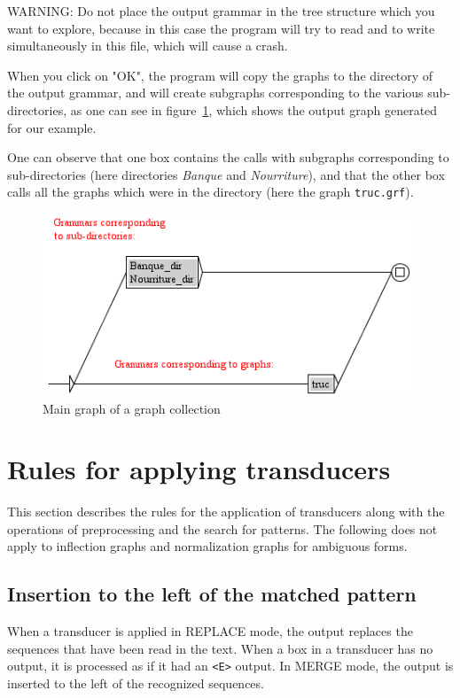 \bigskip
\noindent WARNING: Do not place the output grammar in the tree structure which
you want to explore, because in this case the program will try to read and to write
simultaneously in this file, which will cause a crash.

\bigskip
\noindent When you click on "OK", the program will copy the graphs to the directory of the
output grammar, and will create subgraphs corresponding to the various
sub-directories, as one can see in figure~\ref{fig-graph-collection}, which
shows the output graph generated for our example.

\bigskip
\noindent One can observe that one box contains the calls with subgraphs corresponding to
sub-directories (here directories \textit{Banque} and \textit{Nourriture}), and
that the other box calls  all the graphs which were in the directory (here the
graph \texttt{truc.grf}).

\begin{figure}[!h]
\begin{center}
\includegraphics[width=11cm]{resources/img/fig6-21.png}
\caption{Main graph of a graph collection\label{fig-graph-collection}}
\end{center}
\end{figure}



\section{Rules for applying transducers}
\label{section-applying-transducers-rules}
This section describes the rules for the application of transducers along with
the operations of preprocessing and the search for patterns. The following does
not apply to inflection graphs and normalization graphs for ambiguous forms.

\subsection{Insertion to the left of the matched pattern}
When a transducer is applied in REPLACE mode, the output replaces the sequences
that have been read in the text. When a box in a transducer has no
output, it is processed as if it had an \verb+<E>+ output. In MERGE mode, the
output is inserted to the left of the recognized sequences. 

